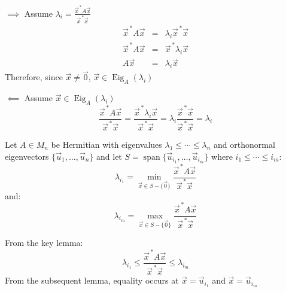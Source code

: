 \documentclass[letterpaper,12pt,fleqn]{article}
\newcommand{\vx}{\vec{x}}
\newcommand{\vxct}{\vx^{\,*}}
\newcommand{\vz}{\vec{0}}
\newcommand{\vu}{\vec{u}}
\renewcommand{\ss}{S-\{\vz\}}
\renewcommand{\l}{\lambda}
\newcommand{\rr}{\frac{\vxct A\vx}{\vxct\vx}}
\DeclareMathOperator{\spn}{span}
\DeclareMathOperator{\Eig}{Eig}
\begin{document}
\begin{theproof}
  \listbreak
  \begin{description}
  \item $\implies$ Assume $\l_i=\rr$
    \begin{eqnarray*}
      \vxct A\vx &=& \l_i\vxct\vx \\
      \vxct A\vx &=& \vxct\l_i\vx \\
      A\vx &=& \l_i\vx
    \end{eqnarray*}
    Therefore, since $\vx\ne\vz$, $\vx\in\Eig_A(\l_i)$

  \item $\impliedby$ Assume $\vx\in\Eig_A(\l_i)$
    \[\rr=\frac{\vxct\l_i\vx}{\vxct\vx}=\l_i\frac{\vxct\vx}{\vxct\vx}=\l_i\]
  \end{description}
\end{theproof}

\begin{corollary}
  Let $A\in M_n$ be Hermitian with eigenvalues $\l_1\le\cdots\le\l_n$ and
  orthonormal eigenvectors $\{\vu_1,\ldots,\vu_n\}$ and let
  $S=\spn\{\vu_{i_1},\ldots,\vu_{i_m}\}$ where $i_1\le\cdots\le i_m$:
  \[\l_{i_1}=\min_{\vx\in\ss}\rr\]
  and:
  \[\l_{i_m}=\max_{\vx\in\ss}\rr\]
\end{corollary}

\begin{theproof}
  From the key lemma:
  \[\l_{i_1}\le\rr\le\l_{i_m}\]
  From the subsequent lemma, equality occurs at $\vx=\vu_{i_1}$ and
  $\vx=\vu_{i_m}$
\end{theproof}
\end{document}
